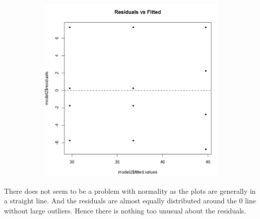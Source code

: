 \documentclass[11pt]{article}
\begin{document}
\begin{figure}[H]
\begin{subfigure}{0.45\textwidth}
        \includegraphics[width=\textwidth]{../pictures/hw2_q2_rf.png}
    \end{subfigure}
\end{figure}

There does not seem to be a problem with normality as the plots are generally in a straight line.
And the residuals are almost equally distributed around the 0 line without large outliers. Hence there is nothing too unusual about the residuals.
\end{document}
